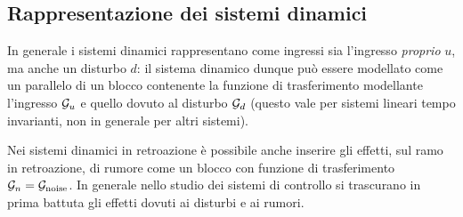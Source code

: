 	\subsection{Rappresentazione dei sistemi dinamici}
		In generale i sistemi dinamici rappresentano come ingressi sia l'ingresso \textit{proprio} $u$, ma anche un disturbo $d$: il sistema dinamico dunque può essere modellato come un parallelo di un blocco contenente la funzione di trasferimento modellante l'ingresso $\mathcal G_u$ e quello dovuto al disturbo $\mathcal G_d$ (questo vale per sistemi lineari tempo invarianti, non in generale per altri sistemi).
		
		Nei sistemi dinamici in retroazione è possibile anche inserire gli effetti, sul ramo in retroazione, di rumore come un blocco con funzione di trasferimento $\mathcal G_n = \mathcal G_\textrm{noise}$. In generale nello studio dei sistemi di controllo si trascurano in prima battuta gli effetti dovuti ai disturbi e ai rumori.
